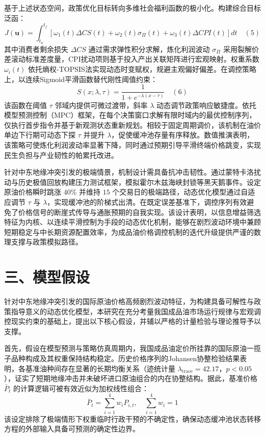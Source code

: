 \documentclass{mcmthesis}
\begin{document}
基于上述状态空间，政策优化目标转向多维社会福利函数的极小化。构建综合目标泛函：
$$ J(\mathbf{u}) = \int_{t_0}^{t_f} \left[ \omega_1(t) \Delta CS(t) + \omega_2(t) \sigma_{\Pi}(t) + \omega_3(t) \Delta CPI(t) \right] dt \quad (5) $$
其中消费者剩余损失 $\Delta CS$ 通过需求弹性积分求解，炼化利润波动 $\sigma_{\Pi}$ 采用裂解价差滚动标准差度量，CPI扰动项则基于投入产出关联矩阵进行宏观映射。权重系数 $\omega_i(t)$ 依托熵权-TOPSIS法实现动态时变赋权，规避主观偏好偏差。在调控策略上，以连续Sigmoid平滑函数替代刚性阈值约束：
$$ S(x; \lambda, \tau) = \frac{1}{1+e^{-\lambda(x-\tau)}} \quad (6) $$
该函数在阈值 $\tau$ 邻域内提供可微过渡带，斜率 $\lambda$ 动态调节政策响应敏捷度。依托模型预测控制（MPC）框架，在每个决策窗口求解有限时域内的最优控制序列，仅执行首步指令并基于新观测状态重新规划。相较于固定周期调价，该机制在油价单边下行期可动态下探 $\tau$ 并提升 $\lambda$，促使缓冲池存量有序释放。数值推演表明，该策略可使炼化利润波动率显著下降，同时通过预期引导平滑终端价格跳变，实现民生负担与产业韧性的帕累托改进。

针对中东地缘冲突引发的极端情景，机制设计需具备抗冲击韧性。通过蒙特卡洛扰动与历史极值回放构建压力测试框架，模拟霍尔木兹海峡封锁等黑天鹅事件。设定原油价格瞬时跳涨 $40\%$ 并维持 $15$ 个交易日的极端路径，动态优化模型通过自适应调节 $\tau$ 与 $\lambda$，实现缓冲池的阶梯式出清。在既定误差基准下，调控序列有效避免了价格信号的断崖式传导与通胀预期的自我实现。该设计表明，以信息增益筛选特征为内核、以连续平滑控制为手段的动态优化机制，能够在剧烈波动环境中兼顾短期稳定与中长期资源配置效率，为成品油价格调控机制的迭代升级提供严谨的数理支撑与政策模拟路径。


\section{ 三、模型假设}

针对中东地缘冲突引发的国际原油价格高频剧烈波动特征，为构建具备可解性与政策指导意义的动态优化模型，本研究在充分考量我国成品油市场运行规律与宏观调控现实约束的基础上，提出以下核心假设，并辅以严格的计量检验与理论推导予以支撑。

首先，假设在模型预测与策略仿真周期内，我国成品油定价所挂靠的国际原油一揽子品种构成及其权重保持结构稳定。历史价格序列的Johansen协整检验结果表明，各基准油种间存在显著的长期均衡关系（迹统计量 $\lambda_{\text{trace}}=42.17$，$p<0.05$），证实了短期地缘冲击并未破坏进口原油组合的内在协整结构。据此，基准价格 $\bar{P}_t$ 的计算逻辑可被有效近似为加权线性组合：
$$ \bar{P}_t = \sum_{i=1}^{4} w_i P_{i,t}, \quad \sum_{i=1}^{4} w_i = 1 \tag{1} $$
该设定排除了极端情形下权重临时行政干预的不确定性，确保动态缓冲池状态转移方程的外部输入具备可预测的确定性边界。
\end{document}
